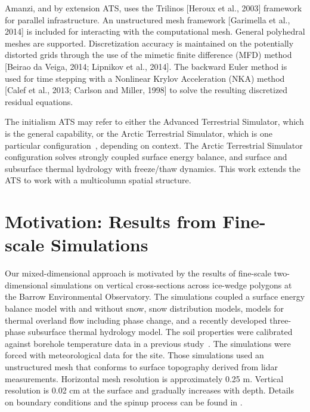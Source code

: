 \documentclass[review]{elsarticle}
\begin{document}
Amanzi, and by extension ATS, uses the Trilinos [Heroux et al., 2003] framework for parallel infrastructure. An unstructured mesh framework [Garimella et al., 2014] is included for interacting with the computational mesh. General polyhedral meshes are supported. Discretization accuracy is maintained on the potentially distorted grids through the use of the mimetic finite difference (MFD) method [Beirao da Veiga, 2014; Lipnikov et al., 2014]. The backward Euler method is used for time stepping with a Nonlinear Krylov Acceleration (NKA) method [Calef et al., 2013; Carlson and Miller, 1998] to solve the resulting discretized residual equations. 

 The initialism ATS may refer to either the Advanced Terrestrial Simulator, which is the general capability, or the Arctic Terrestrial Simulator, which is one particular configuration~\cite{spainter2016integrated}, depending on context. The Arctic Terrestrial Simulator configuration solves strongly coupled surface energy balance, and surface and subsurface thermal hydrology with freeze/thaw dynamics. This work extends the ATS to work with a multicolumn spatial structure. 


\section{Motivation: Results from Fine-scale Simulations}\label{motivation}

Our mixed-dimensional approach is motivated by the results of fine-scale two-dimensional simulations on vertical cross-sections across ice-wedge polygons at the Barrow Environmental Observatory. The simulations coupled a surface energy balance model with and without snow, snow distribution models, models for thermal overland flow including phase change, and a recently developed three-phase subsurface thermal hydrology model. The soil properties were calibrated against borehole temperature data in a previous study~\cite{atchley2015}. The simulations were forced with meteorological data for the site. Those simulations used an unstructured mesh that conforms to surface topography derived from lidar measurements. Horizontal mesh resolution is approximately 0.25 m. Vertical resolution is 0.02 cm at the surface and gradually increases with depth. Details on boundary conditions and the spinup process can be found in \cite{spainter2016integrated}. 
\end{document}
